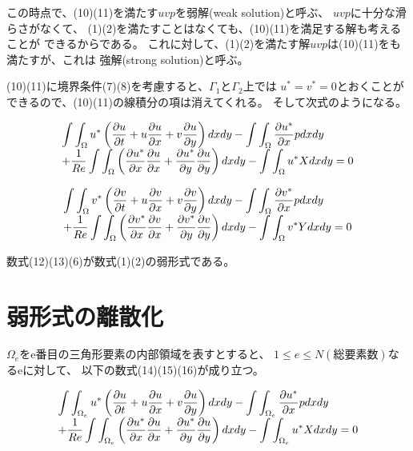 \documentclass{jarticle}
\begin{document}
この時点で、(10)(11)を満たす$uvp$を弱解(weak solution)と呼ぶ、
$uvp$に十分な滑らさがなくて、
(1)(2)を満たすことはなくても、(10)(11)を満足する解も考えることが
できるからである。
これに対して、(1)(2)を満たす解$uvp$は(10)(11)をも満たすが、これは
強解(strong solution)と呼ぶ。


(10)(11)に境界条件(7)(8)を考慮すると、$\Gamma_1$と$\Gamma_2$上では
$u^*=v^*=0$とおくことができるので、(10)(11)の線積分の項は消えてくれる。
そして次式のようになる。



\begin{equation}
\begin{tabular}{l}
$\displaystyle
\int\int_\Omega u^*\left(\frac{\partial u}{\partial t}+u\frac{\partial u}{\partial x}+v\frac{\partial u}{\partial y}\right)dxdy - \int\int_\Omega\frac{\partial u^*}{\partial x}pdxdy
$
\\
$\displaystyle
+\frac{1}{Re}\int\int_\Omega\left(\frac{\partial u^*}{\partial x}\frac{\partial u}{\partial x}+\frac{\partial u^*}{\partial y}\frac{\partial u}{\partial y}\right)dxdy-\int\int_\Omega u^*Xdxdy=0
$
\end{tabular}
\end{equation}

\begin{equation}
\begin{tabular}{l}
$\displaystyle
\int\int_\Omega v^*\left(\frac{\partial v}{\partial t}+u\frac{\partial v}{\partial x}+v\frac{\partial v}{\partial y}\right)dxdy - \int\int_\Omega\frac{\partial v^*}{\partial x}pdxdy
$
\\
$\displaystyle
+\frac{1}{Re}\int\int_\Omega\left(\frac{\partial v^*}{\partial x}\frac{\partial v}{\partial x}+\frac{\partial v^*}{\partial y}\frac{\partial v}{\partial y}\right)dxdy-\int\int_\Omega v^*Ydxdy=0
$
\end{tabular}
\end{equation}

数式(12)(13)(6)が数式(1)(2)の弱形式である。

\section{弱形式の離散化}


$\Omega_e$をe番目の三角形要素の内部領域を表すとすると、
$1\leq e \leq N(総要素数)$なるeに対して、
以下の数式(14)(15)(16)が成り立つ。


\begin{equation}
\begin{tabular}{l}
$\displaystyle
\int\int_{\Omega_e} u^*\left(\frac{\partial u}{\partial t}+u\frac{\partial u}{\partial x}+v\frac{\partial u}{\partial y}\right)dxdy - \int\int_{\Omega_e}\frac{\partial u^*}{\partial x}pdxdy
$
\\
$\displaystyle
+\frac{1}{Re}\int\int_{\Omega_e}\left(\frac{\partial u^*}{\partial x}\frac{\partial u}{\partial x}+\frac{\partial u^*}{\partial y}\frac{\partial u}{\partial y}\right)dxdy-\int\int_{\Omega_e} u^*Xdxdy=0
$
\end{tabular}
\end{equation}
\end{document}
